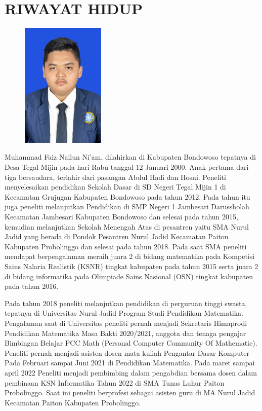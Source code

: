 \newpage
\chapter*{RIWAYAT HIDUP}

\noindent
\begin{figure}
\includegraphics[width=4cm, height=6cm]{Gambar/pas foto.jpg} 
\end{figure}

Muhammad Faiz Nailun Ni'am, dilahirkan di Kabupaten Bondowoso tepatnya di Desa Tegal Mijin pada hari Rabu tanggal 12 Januari 2000. Anak pertama dari tiga bersaudara, terlahir dari pasangan Abdul Hadi dan Hosni. Peneliti menyelesaikan pendidikan Sekolah Dasar di SD Negeri Tegal Mijin 1 di Kecamatan Grujugan Kabupaten Bondowoso pada tahun 2012. Pada tahun itu juga peneliti melanjutkan Pendidikan di SMP Negeri 1 Jambesari Darussholah Kecamatan Jambesari Kabupaten Bondowoso dan selesai pada tahun 2015, kemudian melanjutkan Sekolah Menengah Atas di pesantren yaitu SMA Nurul Jadid yang berada di Pondok Pesantren Nurul Jadid Kecamatan Paiton Kabupaten Probolinggo dan selesai pada tahun 2018. Pada saat SMA peneliti mendapat berpengalaman meraih juara 2 di bidang matematika pada Kompetisi Sains Nalaria Realistik (KSNR) tingkat kabupaten pada tahun 2015 serta juara 2 di bidang informatika pada Olimpiade Sains Nasional (OSN) tingkat kabupaten pada tahun 2016.

Pada tahun 2018 peneliti melanjutkan pendidikan di perguruan tinggi swasta, tepatnya di Universitas Nurul Jadid Program Studi Pendidikan Matematika. Pengalaman saat di Universitas peneliti pernah menjadi Sekretaris Himaprodi Pendidikan Matematika Masa Bakti 2020/2021, anggota dan tenaga pengajar Bimbingan Belajar PCC Math (Personal Computer Community Of Mathematic). Peneliti pernah menjadi asisten dosen mata kuliah Pengantar Dasar Komputer Pada Februari sampai Juni 2021 di Pendidikan Matematika. Pada maret sampai april 2022 Peneliti menjadi pembimbing dalam pengabdian bersama dosen dalam pembinaan KSN Informatika Tahun 2022 di SMA Tunas Luhur Paiton Probolinggo. Saat ini peneliti berprofesi sebagai asisten guru di MA Nurul Jadid Kecamatan Paiton Kabupaten Probolinggo. 